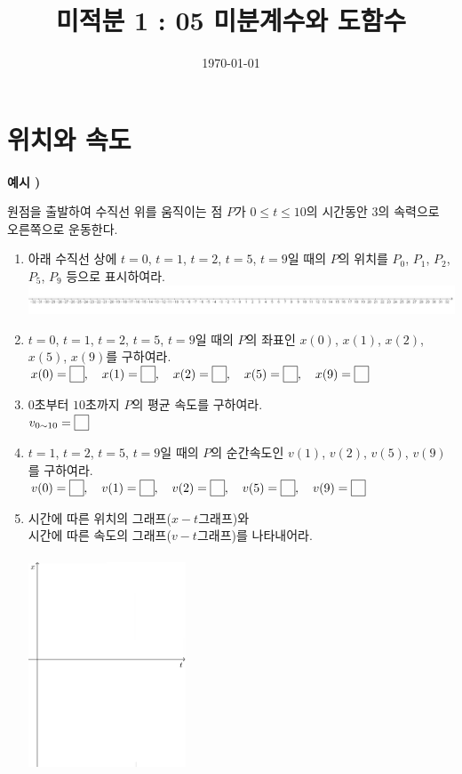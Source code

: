 \documentclass{oblivoir}
\title{미적분 1 : 05 미분계수와 도함수}
\date{\today}
\author{}
\newcounter{num}
\newcommand\exam[1]
{\bigskip\par\noindent\stepcounter{num} \textbf{예시 \thenum) #1}\par\noindent}
\newcommand\pb[1]{\ensuremath{\fbox{\phantom{#1}}}}
\let\oldsection\section
\renewcommand\section{\clearpage\oldsection}
\begin{document}
\maketitle

\tableofcontents
\clearpage

\section{위치와 속도}
%
\exam{}
원점을 출발하여 수직선 위를 움직이는 점 \(P\)가 \(0\le t\le 10\)의 시간동안 \(3\)의 속력으로 오른쪽으로 운동한다.
\begin{enumerate}[label=(\(\arabic*\))]
\item
아래 수직선 상에 \(t=0\), \(t=1\), \(t=2\), \(t=5\), \(t=9\)일 때의 \(P\)의 위치를 \(P_0\), \(P_1\), \(P_2\), \(P_5\), \(P_9\) 등으로 표시하여라.\\
\includegraphics[width=1.3\textwidth]{line2}
\item
\(t=0\), \(t=1\), \(t=2\), \(t=5\), \(t=9\)일 때의 \(P\)의 좌표인 \(x(0)\), \(x(1)\), \(x(2)\), \(x(5)\), \(x(9)\)를 구하여라.\\
\(x(0)=\pb{1},\quad x(1)=\pb{1},\quad x(2)=\pb{1},\quad x(5)=\pb{1},\quad x(9)=\pb{1}\)
\item
\(0\)초부터 \(10\)초까지 \(P\)의 평균 속도를 구하여라.\\
\(v_{0\sim10}=\pb{1}\)
\item
\(t=1\), \(t=2\), \(t=5\), \(t=9\)일 때의 \(P\)의 순간속도인 \(v(1)\), \(v(2)\), \(v(5)\), \(v(9)\)를 구하여라.\\
\(v(0)=\pb{1},\quad v(1)=\pb{1},\quad v(2)=\pb{1},\quad v(5)=\pb{1},\quad v(9)=\pb{1}\)
\item
시간에 따른 위치의 그래프(\(x-t\)그래프)와 \\시간에 따른 속도의 그래프(\(v-t\)그래프)를 나타내어라.\\\\
\includegraphics[width=0.37\textwidth]{xt}\qquad\qquad

\end{enumerate}
\end{document}
